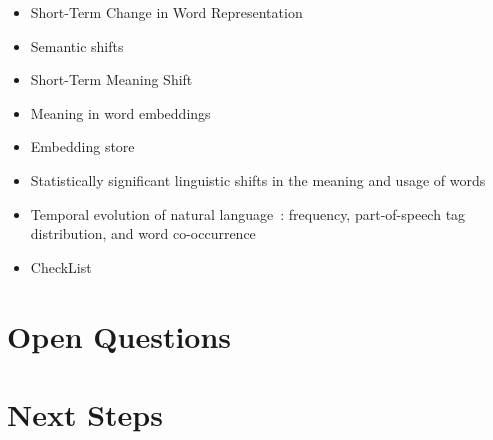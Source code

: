\documentclass{article}
\begin{document}
\begin{itemize}
    \item Short-Term Change in Word Representation~\cite{stewartMeasuringPredictingVisualizing}
    \item Semantic shifts~\cite{azarbonyadWordsAreMalleable2017}
    \item Short-Term Meaning Shift~\cite{deltrediciShortTermMeaningShift2018}
    \item Meaning in word embeddings~\cite{mikolovDistributedRepresentationsWords2013}
    \item Embedding store~\cite{orrManagingMLPipelines2021a}
    \item Statistically significant linguistic shifts in the meaning and usage of words~\cite{kulkarniStatisticallySignificantDetection2015}
    \item Temporal evolution of natural language~\cite{kulkarniStatisticallySignificantDetection2015}: frequency, part-of-speech tag distribution, and word co-occurrence
    \item CheckList~\cite{ribeiroAccuracyBehavioralTesting2020}
\end{itemize}
\section{Open Questions}
\section{Next Steps}

\printbibliography
\end{document}
